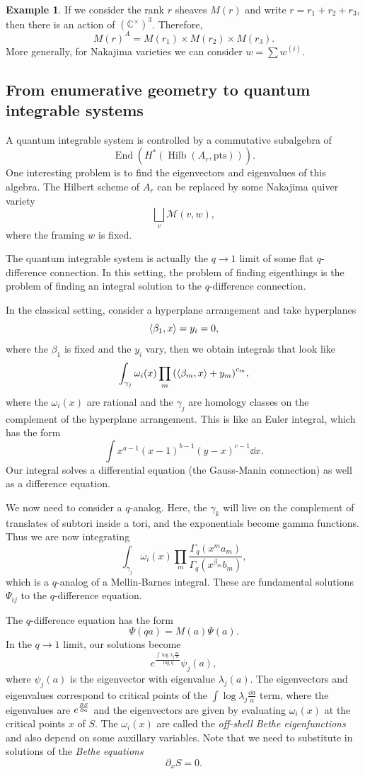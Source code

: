\documentclass[leqno, openany]{memoir}
\theoremstyle{definition}
\newtheorem{exm}[thm]{Example}
\theoremstyle{remark}
\theoremstyle{plain}
\theoremstyle{definition}
\theoremstyle{remark}
\newcommand{\C}{\mathbb{C}}
\newcommand{\mc}[1]{\mathcal{#1}}
\newcommand{\mr}[1]{\mathrm{#1}}
\DeclareMathOperator{\End}{End}
\DeclareMathOperator{\Hilb}{Hilb}
\begin{document}
\begin{exm}
    If we consider the rank $r$ sheaves $M(r)$ and write $r = r_1 + r_2 + r_3$, then there is an action of $(\C^{\times})^3$. Therefore,
    \[ M(r)^A = M(r_1) \times M(r_2) \times M(r_3). \]
    More generally, for Nakajima varieties we can consider $w = \sum w^{(i)}$.
\end{exm}

\subsection{From enumerative geometry to quantum integrable systems}

A quantum integrable system is controlled by a commutative subalgebra of
\[ \End(H^*(\Hilb(A_r, \mr{pts}))). \]
One interesting problem is to find the eigenvectors and eigenvalues of this algebra. The Hilbert scheme of $A_r$ can be replaced by some Nakajima quiver variety
\[ \bigsqcup_v \mc{M}(v, w), \]
where the framing $w$ is fixed.

The quantum integrable system is actually the $q \to 1$ limit of some flat $q$-difference connection. In this setting, the problem of finding eigenthings is the problem of finding an integral solution to the $q$-difference connection. 

In the classical setting, consider a hyperplane arrangement and take hyperplanes
\[ \ev{\beta_1,x} = y_i = 0, \]
where the $\beta_1$ is fixed and the $y_i$ vary, then we obtain integrals that look like
\[ \int_{\gamma_j} \omega_i(x) \prod_m \qty(\ev{\beta_m, x} + y_m)^{c_m}, \]
where the $\omega_i(x)$ are rational and the $\gamma_j$ are homology classes on the complement of the hyperplane arrangement. This is like an Euler integral, which has the form
\[ \int x^{a-1}(x-1)^{b-1}(y-x)^{c-1} \dd{x}. \]
Our integral solves a differential equation (the Gauss-Manin connection) as well as a difference equation.

We now need to consider a $q$-analog. Here, the $\gamma_k$ will live on the complement of translates of subtori inside a tori, and the exponentials become gamma functions. Thus we are now integrating
\[ \int_{\gamma_j} \omega_i(x) \prod_m \frac{\Gamma_q(x^{m} a_m)}{\Gamma_q(x^{\beta_m}b_m)}, \]
which is a $q$-analog of a Mellin-Barnes integral. These are fundamental solutions $\Psi_{ij}$ to the $q$-difference equation.

The $q$-difference equation has the form 
\[ \Psi(qa) = M(a) \Psi(a). \]
In the $q \to 1$ limit, our solutions become
\[ e^{\frac{\int \log \lambda_j \frac{\dd{a}}{a}}{\log q}} \psi_j(a), \]
where $\psi_j(a)$ is the eigenvector with eigenvalue $\lambda_j(a)$. The eigenvectors and eigenvalues correspond to critical points of the $\int \log \lambda_j \frac{\dd{a}}{a}$ term, where the eigenvalues are $e^{\pdv{S}{a}}$ and the eigenvectors are given by evaluating $\omega_i(x)$ at the critical points $x$ of $S$. The $\omega_i(x)$ are called the \textit{off-shell Bethe eigenfunctions} and also depend on some auxillary variables. Note that we need to substitute in solutions of the \textit{Bethe equations} 
\[ \partial_x S = 0. \]
\end{document}
